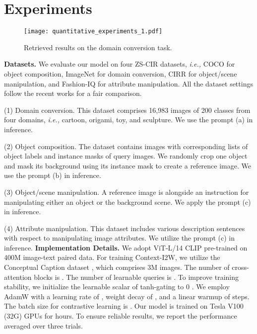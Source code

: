 \documentclass[letterpaper]{article} \usepackage{aaai24}  \usepackage{times}  \usepackage{helvet}  \usepackage{courier}  \usepackage[hyphens]{url}  \usepackage{graphicx} \urlstyle{rm} \def\UrlFont{\rm}  \usepackage{natbib}  \usepackage{caption} \frenchspacing  \setlength{\pdfpagewidth}{8.5in} \setlength{\pdfpageheight}{11in} \usepackage{algorithm}
\begin{document}
\section{Experiments}

\begin{figure}[t]
    \centering
\centering
    \texttt{[image: quantitative\_experiments\_1.pdf]}
    \caption{Retrieved results on the domain conversion task.}
    \vspace{-10pt}
    \label{fig:imgnet}
\end{figure}

\noindent \textbf{Datasets.} We evaluate our model on four ZS-CIR datasets, \textit{i.e.,} COCO \cite{10.1007/978-3-319-10602-1_48} for object composition, ImageNet \cite{deng2009imagenet, Hendrycks_2021_ICCV} for domain conversion, CIRR \cite{Liu_2021_ICCV} for object/scene manipulation, and Fashion-IQ \cite{Wu_2021_CVPR} for attribute manipulation. All the dataset settings follow the recent works \cite{Saito_2023_CVPR, baldrati2023zero} for a fair comparison. 


\noindent (1) Domain conversion. 
This dataset comprises 16,983 images of 200 classes from four domains, \textit{i.e.,} cartoon, origami, toy, and sculpture. We use the prompt (a) in inference. 

\noindent (2) Object composition. The dataset contains images with corresponding lists of object labels and instance masks of query images. We randomly crop one object and mask its background using its instance mask to create a reference image. We use the prompt (b) in inference. 

\noindent (3) Object/scene manipulation. A reference image is alongside an instruction for manipulating either an object or the background scene. We apply the prompt (c) in inference. 

\noindent (4) Attribute manipulation. This dataset includes various description sentences with respect to manipulating image attributes. We utilize the prompt (c) in inference. 
\noindent \textbf{Implementation Details.} We adopt ViT-L/14 CLIP \cite{radford2021learning} pre-trained on 400M image-text paired data. For training Context-I2W, we utilize the Conceptual Caption dataset \cite{DBLP:conf/acl/SoricutDSG18}, which comprises 3M images. The number of cross-attention blocks is . The number of learnable queries is . To improve training stability, we initialize the learnable scalar of tanh-gating to 0 \cite{bachlechner2021rezero}. We employ AdamW \cite{loshchilov2018decoupled} with a learning rate of , weight decay of , and a linear warmup of  steps. The batch size for contrastive learning is . Our model is trained on  Tesla V100 (32G) GPUs for  hours. To ensure reliable results, we report the performance averaged over three trials.
\end{document}
